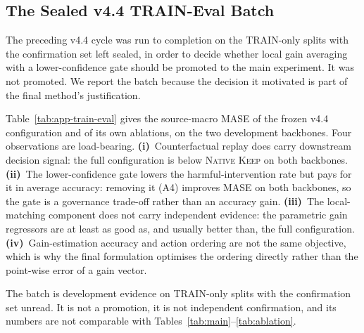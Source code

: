 \documentclass{article}
\begin{document}
\subsection{The Sealed v4.4 TRAIN-Eval Batch}
\label{app:train-eval}
The preceding v4.4 cycle was run to completion on the TRAIN-only splits with the confirmation
set left sealed, in order to decide whether local gain averaging with a lower-confidence gate
should be promoted to the main experiment. It was not promoted. We report the batch because
the decision it motivated is part of the final method's justification.

Table~\ref{tab:app-train-eval} gives the source-macro MASE of the frozen v4.4 configuration and
of its own ablations, on the two development backbones. Four observations are load-bearing.
\textbf{(i)}~Counterfactual replay does carry downstream decision signal: the full
configuration is below \textsc{Native Keep} on both backbones. \textbf{(ii)}~The
lower-confidence gate lowers the harmful-intervention rate but pays for it in average accuracy:
removing it (\textsc{A4}) improves MASE on both backbones, so the gate is a governance
trade-off rather than an accuracy gain. \textbf{(iii)}~The local-matching component does not
carry independent evidence: the parametric gain regressors are at least as good as, and
usually better than, the full configuration. \textbf{(iv)}~Gain-estimation accuracy and action
ordering are not the same objective, which is why the final formulation optimises the ordering
directly rather than the point-wise error of a gain vector.

The batch is development evidence on TRAIN-only splits with the confirmation set unread. It is
not a promotion, it is not independent confirmation, and its numbers are not comparable with
Tables~\ref{tab:main}--\ref{tab:ablation}.
\end{document}
